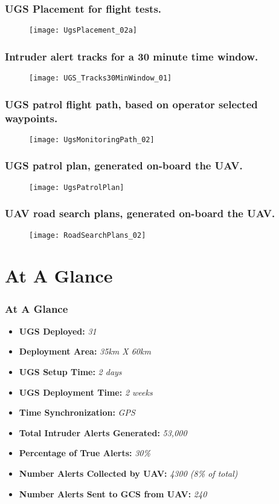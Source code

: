 \documentclass{beamer}
\begin{document}
\begin{frame}\frametitle{UGS Placement for flight tests.} 
\begin{figure}[htb]
\centering
      \texttt{[image: UgsPlacement\_02a]}
\end{figure}
\end{frame}

\begin{frame}\frametitle{Intruder alert tracks for a 30 minute time window.} 
\begin{figure}[htb]
\centering
      \texttt{[image: UGS\_Tracks30MinWindow\_01]}
\end{figure}
\end{frame}

\begin{frame}\frametitle{UGS patrol flight path, based on operator selected waypoints.} 
\begin{figure}[htb]
\centering
      \texttt{[image: UgsMonitoringPath\_02]}
\end{figure}
\end{frame}

\begin{frame}\frametitle{UGS patrol plan, generated on-board the UAV.} 
\begin{figure}[htb]
\centering
      \texttt{[image: UgsPatrolPlan]}
\end{figure}
\end{frame}

\begin{frame}\frametitle{UAV road search plans, generated on-board the UAV.} 
\begin{figure}[htb]
\centering
      \texttt{[image: RoadSearchPlans\_02]}
\end{figure}
\end{frame}

\section{At A Glance}
\begin{frame}\frametitle{At A Glance} 
\begin{itemize}
\item \textbf{UGS Deployed:} \emph{31}
\item \textbf{Deployment Area:} \emph{35km X 60km}
\item \textbf{UGS Setup Time:} \emph{2 days}
\item \textbf{UGS Deployment Time:} \emph{2 weeks}
\item \textbf{Time Synchronization:} \emph{GPS}
\item \textbf{Total Intruder Alerts Generated:} \emph{53,000}
\item \textbf{Percentage of True Alerts:} \emph{30\%}
\item \textbf{Number Alerts Collected by UAV:} \emph{4300 (8\% of total)}
\item \textbf{Number Alerts Sent to GCS from UAV:} \emph{240}
\end{itemize}
\end{frame}
\end{document}
